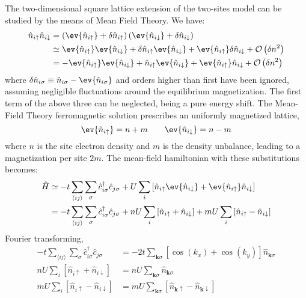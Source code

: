 The two-dimensional square lattice extension of the two-sites model can be studied by the means of Mean Field Theory. We have:
\[
\begin{aligned}
	\hat n_{i\uparrow} \hat n_{i\downarrow} &= \left( \ev{\hat n_{i\uparrow}} + \delta \hat n_{i\uparrow} \right) \left( \ev{\hat n_{i\downarrow}} + \delta \hat n_{i\downarrow} \right) \\
	&\simeq \ev{\hat n_{i\uparrow}} \ev{\hat n_{i\downarrow}} +  \delta \hat n_{i\uparrow} \ev{\hat n_{i\downarrow}} + \ev{\hat n_{i\uparrow}} \delta \hat n_{i\downarrow} + \mathcal{O} \left(\delta n^2\right) \\
	&= - \ev{\hat n_{i\uparrow}} \ev{\hat n_{i\downarrow}} + \hat n_{i\uparrow} \ev{\hat n_{i\downarrow}} + \ev{\hat n_{i\uparrow}} \hat n_{i\downarrow} + \mathcal{O} \left(\delta n^2\right)
\end{aligned}
\]
where $\delta \hat n_{i\sigma} \equiv \hat n_{i\sigma} - \ev{\hat n_{i\sigma}}$ and orders higher than first have been ignored, assuming negligible fluctuations around the equilibrium magnetization. The first term of the above three can be neglected, being a pure energy shift. The Mean-Field Theory ferromagnetic solution prescribes an uniformly magnetized lattice,
\[
	\ev{\hat n_{i\uparrow}} = n+m
	\qquad
	\ev{\hat n_{i\downarrow}} = n-m
\]
where $n$ is the site electron density and $m$ is the density unbalance, leading to a magnetization per site $2m$. The mean-field hamiltonian with these substitutions becomes:
\[
\begin{aligned}
	\hat H &\simeq 
	-t \sum_{\langle ij \rangle} \sum_\sigma \hat c_{i\sigma}^\dagger \hat c_{j\sigma}
	+ U \sum_i \left[
		\hat n_{i\uparrow} \ev{\hat n_{i\downarrow}} + \ev{\hat n_{i\uparrow}} \hat n_{i\downarrow} 
	\right] \\
	&= -t \sum_{\langle ij \rangle} \sum_\sigma \hat c_{i\sigma}^\dagger \hat c_{j\sigma}
	+ nU \sum_i \left[
		\hat n_{i\uparrow} + \hat n_{i\downarrow} 
	\right] + mU \sum_i \left[
		\hat n_{i\uparrow} - \hat n_{i\downarrow} 
	\right]
\end{aligned}
\]
Fourier transforming,
\[
\begin{aligned}
	-t \sum_{\langle ij \rangle} \sum_\sigma \hat c_{i\sigma}^\dagger \hat c_{j\sigma} &= -2t \sum_{\mathbf{k}\sigma} \left[
		\cos(k_x) + \cos(k_y)
	\right] \hat n_{\mathbf{k}\sigma} \\
	nU \sum_i \left[
		\hat n_{i\uparrow} + \hat n_{i\downarrow} 
	\right] &= nU \sum_{\mathbf{k}\sigma} \hat n_{\mathbf{k}\sigma} \\
	mU \sum_i \left[
		\hat n_{i\uparrow} - \hat n_{i\downarrow} 
	\right] &= mU \sum_{\mathbf{k}\sigma} \left[
		\hat n_{\mathbf{k}\uparrow} - \hat n_{\mathbf{k}\downarrow}
	\right]
\end{aligned}
\]
